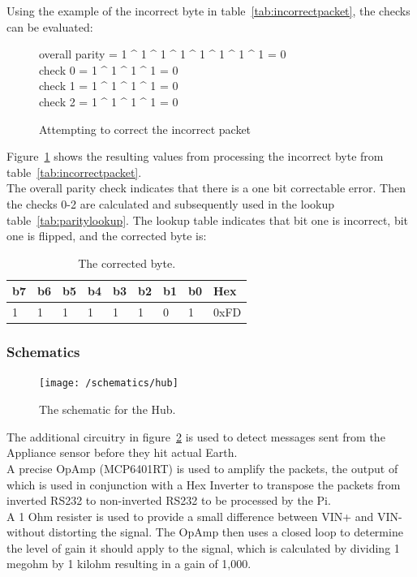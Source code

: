 \documentclass[preprint,12pt,3p]{elsarticle}
\begin{document}
Using the example of the incorrect byte in table~\ref{tab:incorrectpacket}, the checks can be evaluated:
\begin{figure}[H]
\centering
overall parity = 1 \^{} 1 \^{} 1 \^{} 1 \^{} 1 \^{} 1 \^{} 1 \^{} 1 = 0\\
check 0 = 1 \^{} 1 \^{} 1 \^{} 1 = 0\\
check 1 = 1 \^{} 1 \^{} 1 \^{} 1 = 0\\
check 2 = 1 \^{} 1 \^{} 1 \^{} 1 = 0\\
\caption{Attempting to correct the incorrect packet}
\label{fig:xorexample}
\end{figure}
Figure~\ref{fig:xorexample} shows the resulting values from processing the incorrect byte from table~\ref{tab:incorrectpacket}.\\
The overall parity check indicates that there is a one bit correctable error. Then the checks 0-2 are calculated and subsequently used in the lookup table~\ref{tab:paritylookup}. The lookup table indicates that bit one is incorrect, bit one is flipped, and the corrected byte is:
\begin{table}[H]
\centering
\begin{tabular}{| l | l | l | l | l | l | l | l | l |}
\hline
b7 & b6 & b5 & b4 & b3 & b2 & b1 & b0 & Hex\\ \hline
1 & 1 & 1 & 1 & 1 & 1 & 0 & 1  & 0xFD\\ \hline
\end{tabular}
\caption{The corrected byte.}
\label{tab:correctedbyte}
\end{table}


\subsubsection{Schematics}
\begin{figure}[H]
    \centering
    \texttt{[image: /schematics/hub]}
    \caption{The schematic for the Hub.}
    \label{fig:hubschematic}
\end{figure}
The additional circuitry in figure~\ref{fig:hubschematic} is used to detect messages sent from the Appliance sensor before they hit actual Earth.\\
A precise OpAmp (MCP6401RT) is used to amplify the packets, the output of which is used in conjunction with a Hex Inverter to transpose the packets from inverted RS232 to non-inverted RS232 to be processed by the Pi.\\
A 1 Ohm resister is used to provide a small difference between VIN+ and VIN- without distorting the signal. The OpAmp then uses a closed loop to determine the level of gain it should apply to the signal, which is calculated by dividing 1 megohm by 1 kilohm  resulting in a gain of 1,000.
\end{document}
